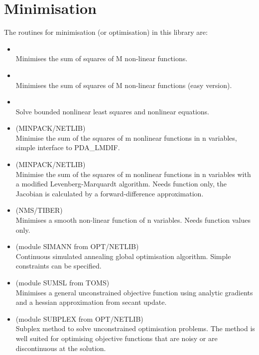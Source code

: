\documentclass[11pt,twoside,nolof]{starlink}
\begin{document}
\section{Minimisation}

   The routines for minimisation (or optimisation) in this library are:

\begin{itemize}

\item {} \\
   Minimises the sum of squares of M non-linear functions.

\item {} \\
   Minimises the sum of squares of M non-linear functions (easy version).

\item {} \\
   Solve bounded nonlinear least squares and nonlinear equations.

\item {} (MINPACK/NETLIB)\ \\
   Minimise the sum of the squares of m nonlinear functions in n
   variables, simple interface to PDA\_LMDIF.

\item {} (MINPACK/NETLIB)\ \\
   Minimise the sum of the squares of m nonlinear functions in n
   variables with a modified Levenberg-Marquardt algorithm. Needs
   function only, the Jacobian is calculated by a forward-difference
   approximation.

\item {} (NMS/TIBER)\ \\
   Minimises a smooth non-linear function of n variables. Needs
   function values only.

\item {} (module SIMANN from OPT/NETLIB)\ \\
   Continuous simulated annealing global optimisation algorithm.
   Simple constraints can be specified.

\item {} (module SUMSL from TOMS)\ \\
   Minimises a general unconstrained objective function using
   analytic gradients and a hessian approximation from secant update.

\item {} (module SUBPLEX from OPT/NETLIB)\ \\
   Subplex method to solve unconstrained optimisation problems.  The
   method is well suited for optimising objective functions that are
   noisy or are discontinuous at the solution.

\end{itemize}
\end{document}
